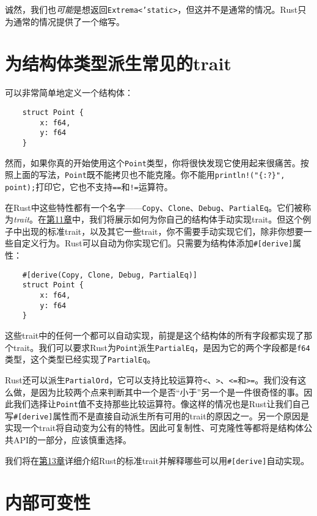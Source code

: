 诚然，我们也\emph{可能}是想返回\texttt{Extrema<'static>}，但这并不是通常的情况。Rust只为通常的情况提供了一个缩写。

\section{为结构体类型派生常见的trait}

可以非常简单地定义一个结构体：
\begin{verbatim}
    struct Point {
        x: f64,
        y: f64
    }
\end{verbatim}

然而，如果你真的开始使用这个\texttt{Point}类型，你将很快发现它使用起来很痛苦。按照上面的写法，\texttt{Point}既不能拷贝也不能克隆。你不能用\texttt{println!("\{:?\}", point);}打印它，它也不支持\texttt{==}和\texttt{!=}运算符。

在Rust中这些特性都有一个名字——\texttt{Copy}、\texttt{Clone}、\texttt{Debug}、\texttt{PartialEq}。它们被称为\emph{trait}。在\hyperref[ch11]{第11章}中，我们将展示如何为你自己的结构体手动实现trait。但这个例子中出现的标准trait，以及其它一些trait，你不需要手动实现它们，除非你想要一些自定义行为。Rust可以自动为你实现它们。只需要为结构体添加\texttt{\#[derive]}属性：
\begin{verbatim}
    #[derive(Copy, Clone, Debug, PartialEq)]
    struct Point {
        x: f64,
        y: f64
    }
\end{verbatim}

这些trait中的任何一个都可以自动实现，前提是这个结构体的所有字段都实现了那个trait。我们可以要求Rust为\texttt{Point}派生\texttt{PartialEq}，是因为它的两个字段都是\texttt{f64}类型，这个类型已经实现了\texttt{PartialEq}。

Rust还可以派生\texttt{PartialOrd}，它可以支持比较运算符\texttt{<}、\texttt{>}、\texttt{<=}和\texttt{>=}。我们没有这么做，是因为比较两个点来判断其中一个是否“小于”另一个是一件很奇怪的事。因此我们选择让\texttt{Point}值不支持那些比较运算符。像这样的情况也是Rust让我们自己写\texttt{\#[derive]}属性而不是直接自动派生所有可用的trait的原因之一。另一个原因是实现一个trait将自动变为公有的特性。因此可复制性、可克隆性等都将是结构体公共API的一部分，应该慎重选择。

我们将在\hyperref[ch13]{第13章}详细介绍Rust的标准trait并解释哪些可以用\texttt{\#[derive]}自动实现。

\section{内部可变性}\label{intermut}

